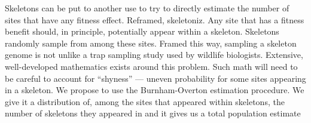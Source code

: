 Skeletons can be put to another use to try to directly estimate the number of sites that have any fitness effect.
Reframed, skeletoniz.
Any site that has a fitness benefit should, in principle, potentially appear within a skeleton.
Skeletons randomly sample from among these sites.
Framed this way, sampling a skeleton genome is not unlike a trap sampling study used by wildlife biologists.
Extensive, well-developed mathematics exists around this problem.
Such math will need to be careful to account for ``shyness'' --- uneven probability for some sites appearing in a skeleton.
We propose to use the Burnham-Overton estimation procedure.
We give it a distribution of, among the sites that appeared within skeletons, the number of skeletons they appeared in and it gives us a total population estimate

